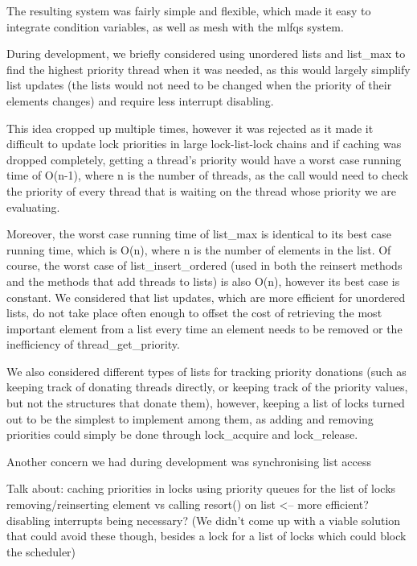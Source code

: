 The resulting system was fairly simple and flexible, which made it easy to integrate condition variables, as well as mesh with the mlfqs system.


During development, we briefly considered using unordered lists and list_max to find the highest priority thread when it was needed, as this would largely simplify list updates (the lists would not need to be changed when the priority of their elements changes) and require less interrupt disabling.

This idea cropped up multiple times, however it was rejected as it made it difficult to update lock priorities in large lock-list-lock chains and if caching was dropped completely, getting a thread's priority would have a worst case running time of O(n-1), where n is the number of threads, as the call would need to check the priority of every thread that is waiting on the thread whose priority we are evaluating.

Moreover, the worst case running time of list_max is identical to its best case running time, which is O(n), where n is the number of elements in the list.
Of course, the worst case of list_insert_ordered (used in both the reinsert methods and the methods that add threads to lists) is also O(n), however its best case is constant.
We considered that list updates, which are more efficient for unordered lists, do not take place often enough to offset the cost of retrieving the most important element from a list every time an element needs to be removed or the inefficiency of thread_get_priority.

We also considered different types of lists for tracking priority donations (such as keeping track of donating threads directly, or keeping track of the priority values, but not the structures that donate them), however, keeping a list of locks turned out to be the simplest to implement among them, as adding and removing priorities could simply be done through lock_acquire and lock_release.

Another concern we had during development was synchronising list access 

Talk about:
	caching priorities in locks
	using priority queues for the list of locks
  removing/reinserting element vs calling resort() on list <-- more efficient?
	disabling interrupts being necessary? (We didn't come up with a viable solution that could avoid these though, besides a lock for a list of locks which could block the scheduler)
